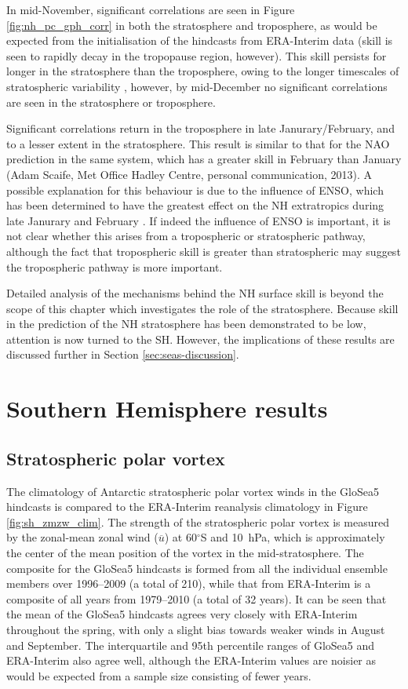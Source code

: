 In mid-November, significant correlations are seen in Figure
\ref{fig:nh_pc_gph_corr} in both the stratosphere and troposphere, as would be
expected from the initialisation of the hindcasts from ERA-Interim data (skill
is seen to rapidly decay in the tropopause region, however). This skill persists
for longer in the stratosphere than the troposphere, owing to the longer
timescales of stratospheric variability \citep[e.g.,][]{Simpson2011}, however,
by mid-December no significant correlations are seen in the stratosphere or
troposphere. 

Significant correlations return in the troposphere in late Janurary/February,
and to a lesser extent in the stratosphere. This result is similar to that for
the NAO prediction in the same system, which has a greater skill in February
than January (Adam Scaife, Met Office Hadley Centre, personal communication,
2013). A possible explanation for this behaviour is due to the influence of
ENSO, which has been determined to have the greatest effect on the NH
extratropics during late Janurary and February \citep{Bell2009}. If indeed the
influence of ENSO is important, it is not clear whether this arises from a
tropospheric or stratospheric pathway, although the fact that tropospheric skill
is greater than stratospheric may suggest the tropospheric pathway is more
important.

Detailed analysis of the mechanisms behind the NH surface skill is beyond the
scope of this chapter which investigates the role of the stratosphere. Because
skill in the prediction of the NH stratosphere has been demonstrated to be low,
attention is now turned to the SH. However, the implications of these results
are discussed further in Section \ref{sec:seas-discussion}. 


\section{Southern Hemisphere results}
\label{sec:south-hemisph-result}

\subsection{Stratospheric polar vortex}


The climatology of Antarctic stratospheric polar vortex winds in the GloSea5
hindcasts is compared to the ERA-Interim reanalysis climatology in Figure
\ref{fig:sh_zmzw_clim}. The strength of the stratospheric polar vortex is
measured by the zonal-mean zonal wind ($\overline{u}$) at 60$^{\circ}$S and
10~hPa, which is approximately the center of the mean position of the vortex in
the mid-stratosphere. The composite for the GloSea5 hindcasts is formed from all
the individual ensemble members over 1996--2009 (a total of 210), while that
from ERA-Interim is a composite of all years from 1979--2010 (a total of 32
years). It can be seen that the mean of the GloSea5 hindcasts agrees very
closely with ERA-Interim throughout the spring, with only a slight bias towards
weaker winds in August and September. The interquartile and 95th percentile
ranges of GloSea5 and ERA-Interim also agree well, although the ERA-Interim
values are noisier as would be expected from a sample size consisting of fewer
years.

